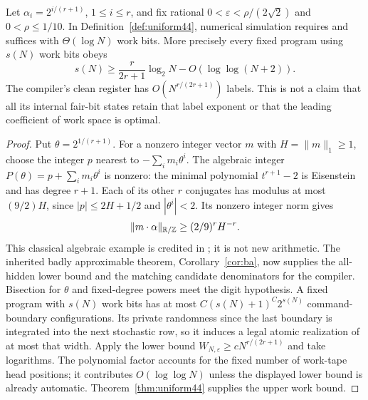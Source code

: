 \begin{corollary}\label{cor:space44}
Let $\alpha_i=2^{i/(r+1)}$, $1\le i\le r$, and fix rational
$0<\varepsilon<\rho/(2\sqrt2)$ and $0<\rho\le1/10$.
In Definition~\ref{def:uniform44}, numerical simulation requires and
suffices with $\Theta(\log N)$ work bits. More precisely every fixed
program using $s(N)$ work bits obeys
\begin{equation}\label{eq:space-lower44}
 s(N)\ge\frac r{2r+1}\log_2N-O(\log\log(N+2)).
\end{equation}
The compiler's clean register has
$O(N^{r/(2r+1)})$ labels. This is not a claim that all its internal
fair-bit states retain that label exponent or that the leading
coefficient of work space is optimal.
\end{corollary}
\begin{proof}
Put $\theta=2^{1/(r+1)}$. For a nonzero integer vector $m$ with
$H=\|m\|_1\ge1$, choose the integer $p$ nearest to
$-\sum_i m_i\theta^i$. The algebraic integer
$P(\theta)=p+\sum_i m_i\theta^i$ is nonzero: the minimal polynomial
$t^{r+1}-2$ is Eisenstein and has degree $r+1$. Each of its other
$r$ conjugates has modulus at most $(9/2)H$, since
$|p|\le2H+1/2$ and $|\theta^i|<2$.
Its nonzero integer norm gives
\[
 \|m\cdot\alpha\|_{\mathbb R/\mathbb Z}\ge(2/9)^rH^{-r}.
\]
This classical algebraic example is credited in \cite{DGLPS}; it is
not new arithmetic. The inherited badly approximable theorem,
Corollary~\ref{cor:ba}, now supplies the all-hidden lower bound and
the matching candidate denominators for the compiler.
Bisection for $\theta$ and fixed-degree powers meet the digit hypothesis.
A fixed program with $s(N)$ work bits has at most $C(s(N)+1)^C2^{s(N)}$
command-boundary configurations. Its private randomness since the last
boundary is integrated into the next stochastic row, so it induces a
legal atomic realization of at most that width. Apply the lower bound
$W_{N,\varepsilon}\ge cN^{r/(2r+1)}$ and take logarithms. The polynomial factor accounts for the fixed number of work-tape head positions; it contributes $O(\log\log N)$ unless the displayed lower bound is already automatic.
Theorem~\ref{thm:uniform44} supplies the upper work bound.
\end{proof}

